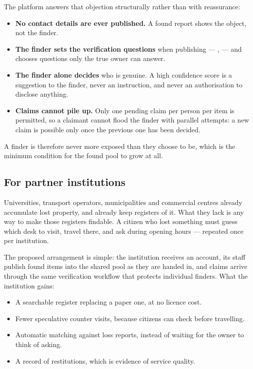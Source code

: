 The platform answers that objection structurally rather than with reassurance:

\begin{itemize}[leftmargin=1.4em,itemsep=3pt]
  \item \textbf{No contact details are ever published.} A found report shows the
        object, not the finder.
  \item \textbf{The finder sets the verification questions} when publishing
        --- ,  --- and chooses questions only the true owner can answer.
  \item \textbf{The finder alone decides} who is genuine. A high confidence
        score is a suggestion to the finder, never an instruction, and never an
        authorisation to disclose anything.
  \item \textbf{Claims cannot pile up.} Only one pending claim per person per
        item is permitted, so a claimant cannot flood the finder with parallel
        attempts: a new claim is possible only once the previous one has been
        decided.
\end{itemize}

A finder is therefore never more exposed than they choose to be, which is the
minimum condition for the found pool to grow at all.

\subsection{For partner institutions}

Universities, transport operators, municipalities and commercial centres already
accumulate lost property, and already keep registers of it. What they lack is
any way to make those registers findable. A citizen who lost something must
guess which desk to visit, travel there, and ask during opening hours ---
repeated once per institution.

The proposed arrangement is simple: the institution receives an account, its
staff publish found items into the shared pool as they are handed in, and claims
arrive through the same verification workflow that protects individual finders.
What the institution gains:

\begin{itemize}[leftmargin=1.4em,itemsep=3pt]
  \item A searchable register replacing a paper one, at no licence cost.
  \item Fewer speculative counter visits, because citizens can check before
        travelling.
  \item Automatic matching against loss reports, instead of waiting for the
        owner to think of asking.
  \item A record of restitutions, which is evidence of service quality.
\end{itemize}

